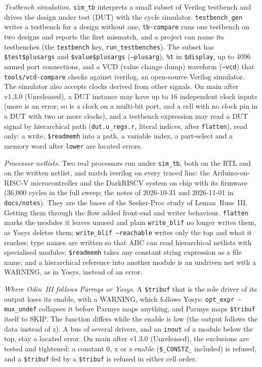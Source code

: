 \documentclass[conference]{IEEEtran}
\newcommand{\code}[1]{\texttt{#1}}
\begin{document}
\emph{Testbench simulation.} \code{sim\_tb} interprets a small subset of Verilog testbench and drives the design under test (DUT) with the cycle simulator. \code{testbench\_gen} writes a testbench for a design without one, \code{tb-compare} runs one testbench on two designs and reports the first mismatch, and a project can name its testbenches (the \code{testbench} key, \code{run\_testbenches}). The subset has \code{\$test\$plusargs} and \code{\$value\$plusargs} (\code{--plusarg}), \code{\%t} in \code{\$display}, up to 4096 named port connections, and a VCD (value change dump) waveform (\code{--vcd}) that \code{tools/vcd-compare} checks against iverilog, an open-source Verilog simulator. The simulator also accepts clocks derived from other signals. On main after v1.3.0 (Unreleased), a DUT instance may have up to 16 independent clock inputs (more is an error; so is a clock on a multi-bit port, and a cell with no clock pin in a DUT with two or more clocks), and a testbench expression may read a DUT signal by hierarchical path (\code{dut.u\_regs.r}, literal indices, after \code{flatten}), read only: a write, \code{\$readmemh} into a path, a variable index, a part-select and a memory word after \code{lower} are located errors.

\emph{Processor netlists.} Two real processors run under \code{sim\_tb}, both on the RTL and on the written netlist, and match iverilog on every traced line: the Arduino-on-RISC-V microcontroller and the DarkRISCV system on chip with its firmware (36,000 cycles in the full sweep; the notes of 2026-10-31 and 2026-11-01 in \code{docs/notes}). They are the bases of the Seeker-Proc study of Leman~Russ~III. Getting them through the flow added front-end and writer behaviour. \code{flatten} marks the modules it leaves unused and plain \code{write\_blif} no longer writes them, as Yosys deletes them; \code{write\_blif --reachable} writes only the top and what it reaches; type names are written so that ABC can read hierarchical netlists with specialised modules; \code{\$readmemh} takes any constant string expression as a file name; and a hierarchical reference into another module is an undriven net with a WARNING, as in Yosys, instead of an error.

\emph{Where Odin~III follows Parmys or Yosys.} A \code{\$tribuf} that is the sole driver of its output loses its enable, with a WARNING, which follows Yosys: \code{opt\_expr -mux\_undef} collapses it before Parmys maps anything, and Parmys maps \code{\$tribuf} itself to SKIP. The function differs while the enable is low (the output follows the data instead of z). A bus of several drivers, and an \code{inout} of a module below the top, stay a located error. On main after v1.3.0 (Unreleased), the exclusions are tested and tightened: a constant 0, x or z enable (\code{\$\_CONSTZ\_} included) is refused, and a \code{\$tribuf} fed by a \code{\$tribuf} is refused in either cell order.
\end{document}
